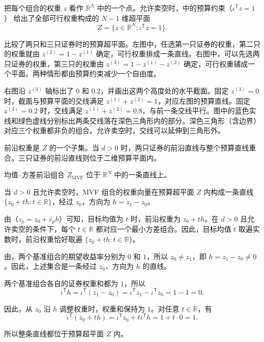把每个组合的权重 $z$ 看作 $\mathbb R^N$ 中的一个点。允许卖空时，中的预算约束（$\iota^{\mathsf T}z=1$） 给出了全部可行权重构成的 $N-1$ 维超平面
\[
 Z=\{z\in\mathbb R^N:\iota^{\mathsf T}z=1\}.
\]

 比较了两只和三只证券时的预算超平面。左图中，任选第一只证券的权重，第二只的权重就由 $z^{(2)}=1-z^{(1)}$ 确定，可行权重排成一条直线。右图中，可以先选两只证券的权重，第三只的权重由 $z^{(3)}=1-z^{(1)}-z^{(2)}$ 确定，可行权重铺成一个平面。两种情形都由预算约束减少一个自由度。

右图沿 $z^{(3)}$ 轴标出了 $0$ 和 $0.2$，并画出这两个高度处的水平截面。固定 $z^{(3)}=0$ 时，截面与预算平面的交线满足 $z^{(1)}+z^{(2)}=1$，对应左图的预算直线。固定 $z^{(3)}=0.2$ 时，交线满足 $z^{(1)}+z^{(2)}=0.8$，与前一条交线平行。图中的蓝色实线和绿色虚线分别标出两条交线落在深色三角形内的部分。深色三角形（含边界）对应三个权重都非负的组合。允许卖空时，交线可以延伸到三角形外。

\begin{center}
\begin{minipage}{\linewidth}
\centering
\renewcommand{\thewjFigure}{\thechapter.S\arabic{wjFigure}}%
%
\par
{}
\end{minipage}
\end{center}

前沿权重是 $Z$ 的一个子集。当 $d>0$ 时，两只证券的前沿直线与整个预算直线重合。三只证券的前沿直线则位于二维预算平面内。

\begin{tcolorbox}[knowledge]
 均值--方差前沿组合 $Z_{\mathrm{MVF}}$ 位于 $\mathbb R^N$ 中的一条直线上。

当 $d>0$ 且允许卖空时，MVF 组合的权重向量在预算超平面 $Z$ 内构成一条直线 $\{z_0+t h:t\in\mathbb R\}$，经过 $z_0$，方向为 $h=z_1-z_0$。
\end{tcolorbox}

\begin{solution}[label-content={证明},blank-type=none]
由（$z_p=z_0+\bar r_p h$）可知，目标均值为 $t$ 时，前沿权重为 $z_0+th$。在 $d>0$ 且允许卖空的条件下，每个 $t\in\mathbb R$ 都对应一个最小方差组合。因此，目标均值 $t$ 取遍实数时，前沿权重恰好取遍 $\{z_0+th:t\in\mathbb R\}$。

由，两个基准组合的期望收益率分别为 $0$ 和 $1$，所以 $z_0\ne z_1$，即 $h=z_1-z_0\ne0$。因此，上述集合是一条经过 $z_0$、方向为 $h$ 的直线。

两个基准组合各自的证券权重和都为 $1$，所以
\[
 \iota^{\mathsf T}h=\iota^{\mathsf T}(z_1-z_0)
 =\iota^{\mathsf T}z_1-\iota^{\mathsf T}z_0=1-1=0.
\]

因此，从 $z_0$ 沿 $h$ 调整权重时，权重和保持为 $1$。对任意 $t\in\mathbb R$，有
\[
 \iota^{\mathsf T}(z_0+th)=\iota^{\mathsf T}z_0+t\iota^{\mathsf T}h=1+t\cdot0=1.
\]

所以整条直线都位于预算超平面 $Z$ 内。
\end{solution}


